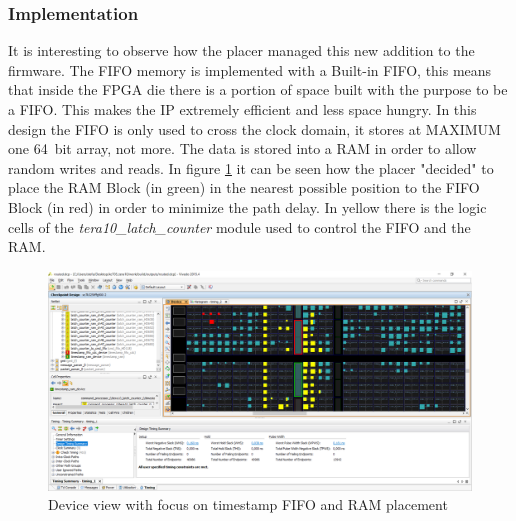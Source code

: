 \subsubsection{Implementation}
\noindent It is interesting to observe how the placer managed this new addition to the firmware. The FIFO memory is implemented with a Built-in FIFO, this means that inside the FPGA die there is a portion of space built with the purpose to be a FIFO. This makes the IP extremely efficient and less space hungry.
In this design the FIFO is only used to cross the clock domain, it stores at MAXIMUM one 64~bit array, not more. The data is stored into a RAM in order to allow random writes and reads.
In figure \ref{fig:fifonearram} it can be seen how the placer "decided" to place the RAM Block (in green) in the nearest possible position to the FIFO Block (in red) in order to minimize the path delay. In yellow there is the logic cells of the \textit{tera10\_latch\_counter} module used to control the FIFO and the RAM.
\begin{figure}[H]
	\centering
	\includegraphics[width=0.95\linewidth]{IMG/ch4/FIFOnearRAM}
	\caption{Device view with focus on timestamp FIFO and RAM placement}
	\label{fig:fifonearram}
\end{figure}

